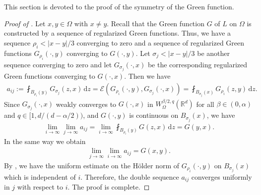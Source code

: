 \documentclass[reqno]{amsart}
\theoremstyle{plain}
\theoremstyle{definition}
\numberwithin{equation}{section}
\newcommand{\Rd}{\mathbb{R}^d}
\renewcommand{\d}{\mathrm{d}}
\begin{document}
This section is devoted to the proof of the symmetry of the Green function.

\begin{proof} [Proof of ]
Let $x, y \in \Omega$ with $x \neq y$. Recall that the Green function $G$ of $L$ on $\Omega$ is constructed by a sequence of regularized Green functions. Thus, we have a sequence $\rho_i < |x- y|/3$ converging to zero and a sequence of regularized Green functions $G_{\rho_i}( \cdot, y)$ converging to $G(\cdot, y)$. Let $\sigma_j < |x-y|/3$ be another sequence converging to zero and let $G_{\sigma_j}(\cdot, x)$ be the corresponding regularized Green functions converging to $G(\cdot, x)$. Then we have
\begin{align*}
a_{ij}:= \fint_{B_{\rho_i}(y)} G_{\sigma_j}(z, x) \,\d z = \mathcal{E}(G_{\rho_i}(\cdot, y), G_{\sigma_j}(\cdot, x)) = \fint_{B_{\sigma_j}(x)} G_{\rho_i}(z, y) \, \d z.
\end{align*}
Since $G_{\sigma_j}(\cdot, x)$ weakly converges to $G(\cdot, x)$ in $W^{\beta/2, q}_\Omega(\Rd)$ for all $\beta \in (0,\alpha)$ and $q \in [1, d/(d-\alpha/2))$, and $G(\cdot, y)$ is continuous on $B_{\sigma_j}(x)$, we have
\begin{align*}
\lim_{i \rightarrow \infty} \lim_{j \rightarrow \infty} a_{ij} = \lim_{i \rightarrow \infty} \fint_{B_{\rho_i}(y)} G(z, x) \, \d z = G(y, x).
\end{align*}
In the same way we obtain
\begin{align*}
\lim_{j \rightarrow \infty} \lim_{i \rightarrow \infty} a_{ij} = G(x, y).
\end{align*}
By \cite[Theorem 1.1]{KaWe22}, we have the uniform estimate on the H\"older norm of $G_{\rho_i}(\cdot, y)$ on $B_{\sigma_j}(x)$ which is independent of $i$. Therefore, the double sequence $a_{ij}$ converges uniformly in $j$ with respect to $i$. The proof is complete.
\end{proof}

% 
% 
\end{document}
